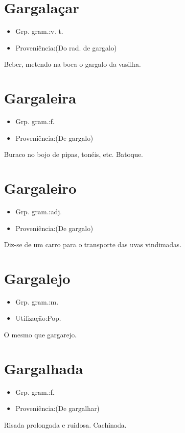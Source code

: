 \section{Gargalaçar}
\begin{itemize}
\item {Grp. gram.:v. t.}
\end{itemize}
\begin{itemize}
\item {Proveniência:(Do rad. de \textunderscore gargalo\textunderscore )}
\end{itemize}
Beber, metendo na boca o gargalo da vasilha.
\section{Gargaleira}
\begin{itemize}
\item {Grp. gram.:f.}
\end{itemize}
\begin{itemize}
\item {Proveniência:(De \textunderscore gargalo\textunderscore )}
\end{itemize}
Buraco no bojo de pipas, tonéis, etc.
Batoque.
\section{Gargaleiro}
\begin{itemize}
\item {Grp. gram.:adj.}
\end{itemize}
\begin{itemize}
\item {Proveniência:(De \textunderscore gargalo\textunderscore )}
\end{itemize}
Diz-se de um carro para o transporte das uvas vindimadas.
\section{Gargalejo}
\begin{itemize}
\item {Grp. gram.:m.}
\end{itemize}
\begin{itemize}
\item {Utilização:Pop.}
\end{itemize}
O mesmo que \textunderscore gargarejo\textunderscore .
\section{Gargalhada}
\begin{itemize}
\item {Grp. gram.:f.}
\end{itemize}
\begin{itemize}
\item {Proveniência:(De \textunderscore gargalhar\textunderscore )}
\end{itemize}
Risada prolongada e ruidosa.
Cachinada.
